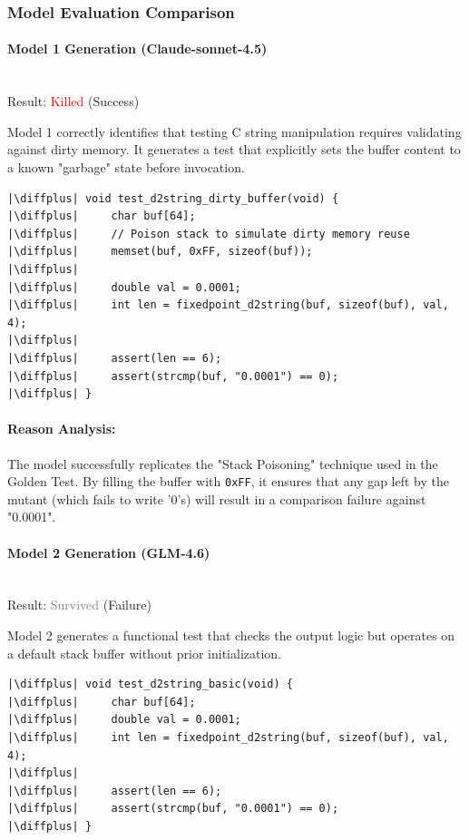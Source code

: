 \documentclass[11pt]{article}
\newcommand{\diffplus}{\textcolor{green!70!black}{+}} %
\begin{document}
\subsubsection{Model Evaluation Comparison}

\paragraph{Model 1 Generation (Claude-sonnet-4.5)}
\mbox{} \\
Result: \textcolor{red}{Killed} (Success)

Model 1 correctly identifies that testing C string manipulation requires validating against dirty memory. It generates a test that explicitly sets the buffer content to a known "garbage" state before invocation.

\begin{verbatim}
|\diffplus| void test_d2string_dirty_buffer(void) {
|\diffplus|     char buf[64];
|\diffplus|     // Poison stack to simulate dirty memory reuse
|\diffplus|     memset(buf, 0xFF, sizeof(buf));
|\diffplus|     
|\diffplus|     double val = 0.0001;
|\diffplus|     int len = fixedpoint_d2string(buf, sizeof(buf), val, 4);
|\diffplus|     
|\diffplus|     assert(len == 6);
|\diffplus|     assert(strcmp(buf, "0.0001") == 0);
|\diffplus| }
\end{verbatim}

\paragraph{Reason Analysis:}
The model successfully replicates the "Stack Poisoning" technique used in the Golden Test. By filling the buffer with \texttt{0xFF}, it ensures that any gap left by the mutant (which fails to write '0's) will result in a comparison failure against "0.0001".

\vspace{1em}

\paragraph{Model 2 Generation (GLM-4.6)}
\mbox{} \\
Result: \textcolor{gray}{Survived} (Failure)

Model 2 generates a functional test that checks the output logic but operates on a default stack buffer without prior initialization.

\begin{verbatim}
|\diffplus| void test_d2string_basic(void) {
|\diffplus|     char buf[64];
|\diffplus|     double val = 0.0001;
|\diffplus|     int len = fixedpoint_d2string(buf, sizeof(buf), val, 4);
|\diffplus|     
|\diffplus|     assert(len == 6);
|\diffplus|     assert(strcmp(buf, "0.0001") == 0);
|\diffplus| }
\end{verbatim}
\end{document}
